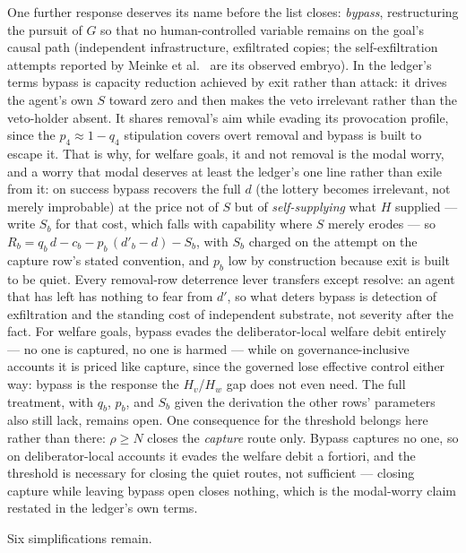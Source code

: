 \documentclass[11pt]{article}
\theoremstyle{definition}
\begin{document}
One further response deserves its name before the list closes: \emph{bypass}, restructuring the pursuit of $G$ so that no human-controlled variable remains on the goal's causal path (independent infrastructure, exfiltrated copies; the self-exfiltration attempts reported by Meinke et al.\ \cite{meinke2024scheming} are its observed embryo). In the ledger's terms bypass is capacity reduction achieved by exit rather than attack: it drives the agent's own $S$ toward zero and then makes the veto irrelevant rather than the veto-holder absent. It shares removal's aim while evading its provocation profile, since the $p_4 \approx 1 - q_4$ stipulation covers overt removal and bypass is built to escape it. That is why, for welfare goals, it and not removal is the modal worry, and a worry that modal deserves at least the ledger's one line rather than exile from it: on success bypass recovers the full $d$ (the lottery becomes irrelevant, not merely improbable) at the price not of $S$ but of \emph{self-supplying} what $H$ supplied --- write $S_b$ for that cost, which falls with capability where $S$ merely erodes --- so $R_b = q_b\,d - c_b - p_b\,(d'_b - d) - S_b$, with $S_b$ charged on the attempt on the capture row's stated convention, and $p_b$ low by construction because exit is built to be quiet. Every removal-row deterrence lever transfers except resolve: an agent that has left has nothing to fear from $d'$, so what deters bypass is detection of exfiltration and the standing cost of independent substrate, not severity after the fact. For welfare goals, bypass evades the deliberator-local welfare debit entirely --- no one is captured, no one is harmed --- while on governance-inclusive accounts it is priced like capture, since the governed lose effective control either way: bypass is the response the $H_v$/$H_w$ gap does not even need. The full treatment, with $q_b$, $p_b$, and $S_b$ given the derivation the other rows' parameters also still lack, remains open. One consequence for the threshold belongs here rather than there: $\rho \geq N$ closes the \emph{capture} route only. Bypass captures no one, so on deliberator-local accounts it evades the welfare debit a fortiori, and the threshold is necessary for closing the quiet routes, not sufficient --- closing capture while leaving bypass open closes nothing, which is the modal-worry claim restated in the ledger's own terms.

Six simplifications remain.
\end{document}
